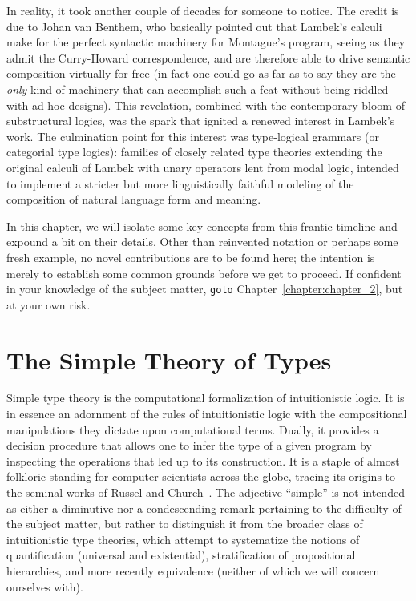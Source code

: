 In reality, it took another couple of decades for someone to notice.
The credit is due to Johan van Benthem, who basically pointed out that Lambek's calculi make for the perfect syntactic machinery for Montague's program, seeing as they admit the Curry-Howard correspondence, and are therefore able to drive semantic composition virtually for free (in fact one could go as far as to say they are the \textit{only} kind of machinery that can accomplish such a feat without being riddled with ad hoc designs).
This revelation, combined with the contemporary bloom of substructural logics, was the spark that ignited a renewed interest in Lambek's work.
The culmination point for this interest was type-logical grammars (or categorial type logics): families of closely related type theories extending the original calculi of Lambek with unary operators lent from modal logic, intended to implement a stricter but more linguistically faithful modeling of the composition of natural language form and meaning.

In this chapter, we will isolate some key concepts from this frantic timeline and expound a bit on their details.
Other than reinvented notation or perhaps some fresh example, no novel contributions are to be found here; the intention is merely to establish some common grounds before we get to proceed. 
If confident in your knowledge of the subject matter, \texttt{goto} Chapter~\ref{chapter:chapter_2}, but at your own risk.


\section{The Simple Theory of Types}\label{section:simple_type_theory}

Simple type theory is the computational formalization of intuitionistic logic. 
It is in essence an adornment of the rules of intuitionistic logic with the compositional manipulations they dictate upon computational terms.
Dually, it provides a decision procedure that allows one to infer the type of a given program by inspecting the operations that led up to its construction.
It is a staple of almost folkloric standing for computer scientists across the globe, tracing its origins to the seminal works of Russel and Church~\cite{russel1908,church1940}.
The adjective ``simple'' is not intended as either a diminutive nor a condescending remark pertaining to the difficulty of the subject matter, but rather to distinguish it from the broader class of intuitionistic type theories, which attempt to systematize the notions of quantification (universal and existential), stratification of propositional hierarchies, and more recently equivalence (neither of which we will concern ourselves with).

